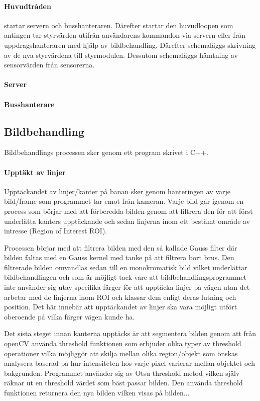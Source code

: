\documentclass[tekniskrapport/tech.tex]{subfiles}
\begin{document}
\paragraph{Huvudtråden} startar servern och busshanteraren. Därefter startar
den huvudloopen som antingen tar styrvärden utifrån användarens kommandon via
servern eller från uppdragshanteraren med hjälp av bildbehandling. Därefter schemaläggs
skrivning av de nya styrvärdena till styrmodulen. Dessutom schemaläggs hämtning
av sensorvärden från sensorerna.

\paragraph{Server}

\paragraph{Busshanterare} 

\subsection{Bildbehandling}
Bildbehandlings processen sker genom ett program skrivet i C++.
\paragraph{Upptäkt av linjer}
Upptäckandet av linjer/kanter på banan sker genom hanteringen av varje bild/frame som programmet tar emot från kameran. Varje bild går igenom en process som börjar med att förberedda bilden genom att filtrera den för att först underlätta kanters upptäckande och sedan linjerna inom ett bestämt område av intresse (Region of Interest ROI).

Processen börjar med att filtrera bilden med den så kallade Gauss filter där bilden faltas med en Gauss kernel med tanke på att filtrera bort brus. Den filtrerade bilden omvandlas sedan till en monokromatisk bild vilket underlättar bildbehandlingen och som är möjligt tack vare att bildbehandlingsprogrammet inte använder sig utav specifika färger för att upptäcka linjer på vägen utan det arbetar med de linjerna inom ROI och klassar dem enligt deras lutning och position. Det här innebär att upptäckandet av linjer ska vara möjligt utfört oberoende på vilka färger vägen kunde ha. 

Det sista steget innan kanterna upptäcks är att segmentera bilden genom att från openCV använda threshold funktionen som erbjuder olika typer av threshold operationer vilka möjliggör att skilja mellan olika region/objekt som önskas analysera baserad på hur intensiteten hos varje pixel varierar mellan objektet och bakgrunden. Programmet använder sig av Otsu threshold metod vilken själv räknar ut en threshold värdet som bäst passar bilden. Den använda threshold funktionen returnera den nya bilden vilken visas på bilden...
\end{document}
